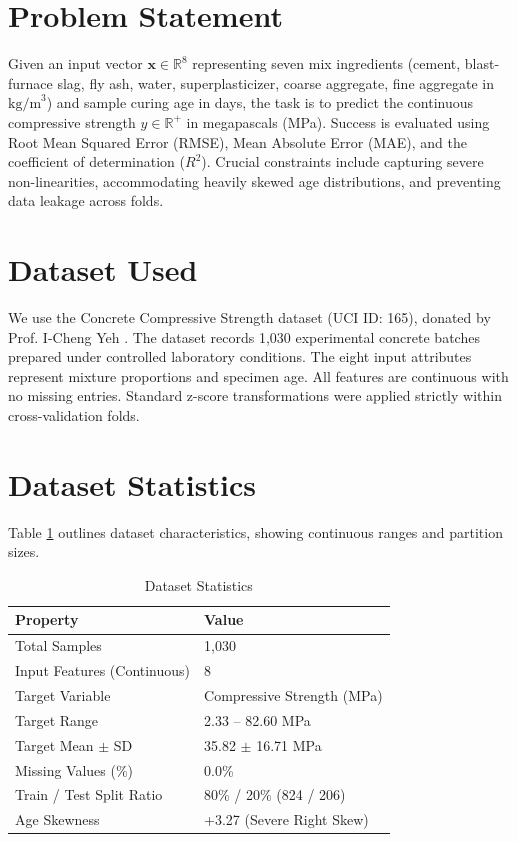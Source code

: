 \documentclass[conference,10pt]{IEEEtran}
\begin{document}
\section{Problem Statement}
Given an input vector $\mathbf{x} \in \mathbb{R}^8$ representing seven mix ingredients (cement, blast-furnace slag, fly ash, water, superplasticizer, coarse aggregate, fine aggregate in $\text{kg/m}^3$) and sample curing age in days, the task is to predict the continuous compressive strength $y \in \mathbb{R}^+$ in megapascals (MPa). Success is evaluated using Root Mean Squared Error (RMSE), Mean Absolute Error (MAE), and the coefficient of determination ($R^2$). Crucial constraints include capturing severe non-linearities, accommodating heavily skewed age distributions, and preventing data leakage across folds.

\section{Dataset Used}
We use the Concrete Compressive Strength dataset (UCI ID: 165), donated by Prof. I-Cheng Yeh \cite{yeh1998}. The dataset records 1,030 experimental concrete batches prepared under controlled laboratory conditions. The eight input attributes represent mixture proportions and specimen age. All features are continuous with no missing entries. Standard z-score transformations were applied strictly within cross-validation folds.

\section{Dataset Statistics}
Table \ref{tab:dataset} outlines dataset characteristics, showing continuous ranges and partition sizes.

\begin{table}[htbp]
\caption{Dataset Statistics}
\label{tab:dataset}
\centering
\begin{tabular}{ll}
\toprule
\textbf{Property} & \textbf{Value} \\
\midrule
Total Samples & 1,030 \\
Input Features (Continuous) & 8 \\
Target Variable & Compressive Strength (MPa) \\
Target Range & 2.33 -- 82.60 MPa \\
Target Mean $\pm$ SD & 35.82 $\pm$ 16.71 MPa \\
Missing Values (\%) & 0.0\% \\
Train / Test Split Ratio & 80\% / 20\% (824 / 206) \\
Age Skewness & +3.27 (Severe Right Skew) \\
\bottomrule
\end{tabular}
\end{table}
\end{document}
